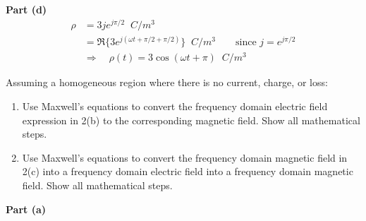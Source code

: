\documentclass[11pt]{article}
\begin{document}
\begin{homeworkProblem}
\textbf{Part (d)}
\begin{align*}
    \rho &= 3 j e^{j\pi/2} \;\; \unit{C/m^3} \\
    &= \Re \{3 e^{j(\omega t + \pi/2 + \pi/2)}\} \;\; \unit{C/m^3} \quad\quad \text{since } j=e^{j\pi/2} \\
    &\Rightarrow \quad \rho(t) = 3 \cos (\omega t + \pi) \;\; \unit{C/m^3}
\end{align*}

\end{homeworkProblem}

\pagebreak

\begin{homeworkProblem}

Assuming a homogeneous region where there is no current, charge, or loss:
\begin{enumerate}[label=(\alph*), topsep=5pt, itemsep=0pt]
    \item Use Maxwell's equations to convert the frequency domain electric field expression in 2(b) to the corresponding
    magnetic field. Show all mathematical steps.
    \item Use Maxwell’s equations to convert the frequency domain magnetic field in 2(c) into a frequency
    domain electric field into a frequency domain magnetic field. Show all mathematical steps.
\end{enumerate} \vspace{1\baselineskip}

\solution

\textbf{Part (a)} \vspace{1\baselineskip}


\end{homeworkProblem}
\end{document}
